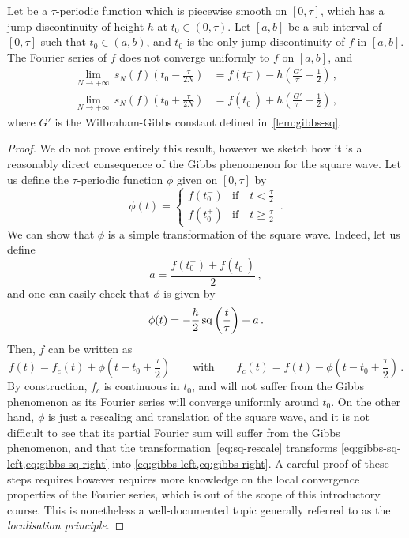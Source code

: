 \begin{theorem}
  Let be a $\tau$-periodic function which is piecewise smooth on $[0,\tau]$, which has a
  jump discontinuity of height $h$ at $t_0\in(0,\tau)$. Let $[a,b]$ be a sub-interval of
  $[0,\tau]$ such that $t_0\in(a,b)$, and $t_0$ is the only jump discontinuity of $f$ in
  $[a,b]$. The Fourier series of $f$ does not converge uniformly to $f$ on $[a,b]$, and
  \begin{align}
    \lim_{N\to+\infty}\,s_N(f)\left(t_0-\frac{\tau}{2N}\right)
    &=f(t_0^-)-h\left(\frac{G'}{\pi}-\frac12\right)\,,\label{eq:gibbs-left}\\
    \lim_{N\to+\infty}\,s_N(f)\left(t_0+\frac{\tau}{2N}\right)
    &=f(t_0^+)+h\left(\frac{G'}{\pi}-\frac12\right)\,,\label{eq:gibbs-right}
  \end{align}
  where $G'$ is the Wilbraham-Gibbs constant defined in~\cref{lem:gibbs-sq}.
\end{theorem}
\begin{proof}
  We do not prove entirely this result, however we sketch how it is a reasonably direct
  consequence of the Gibbs phenomenon for the square wave. Let us define the
  $\tau$-periodic function $\phi$ given on $[0,\tau]$ by
  \begin{equation}
    \phi(t)=
    \begin{cases}
      f(t_0^-)&\text{if}\quad t<\frac{\tau}{2}\\
      f(t_0^+)&\text{if}\quad t\geq \frac{\tau}{2}
    \end{cases}\,.
  \end{equation}
  We can show that $\phi$ is a simple transformation of the square wave. Indeed, let us
  define
  \begin{equation}
    a=\frac{f(t_0^-)+f(t_0^+)}{2}\,,
  \end{equation}
  and one can easily check that $\phi$ is given by
  \begin{equation}
    \phi(t)=-\frac{h}{2}\operatorname{sq}\left(\frac{t}{\tau}\right)+a\,.\label{eq:sq-rescale}
  \end{equation}
  Then, $f$ can be written as
  \begin{equation}
    f(t)=f_c(t)+\phi\left(t-t_0+\frac{\tau}{2}\right)\qquad\text{with}\qquad f_c(t)=f(t)
    -\phi\left(t-t_0+\frac{\tau}{2}\right)\,.
  \end{equation}
  By construction, $f_c$ is continuous in $t_0$, and will not suffer from the Gibbs
  phenomenon as its Fourier series will converge uniformly around $t_0$. On the other
  hand, $\phi$ is just a rescaling and translation of the square wave, and it is not
  difficult to see that its partial Fourier sum will suffer from the Gibbs phenomenon, and
  that the transformation~\cref{eq:sq-rescale} transforms
  \cref{eq:gibbs-sq-left,eq:gibbs-sq-right} into \cref{eq:gibbs-left,eq:gibbs-right}. A
  careful proof of these steps requires however requires more knowledge on the local
  convergence properties of the Fourier series, which is out of the scope of this
  introductory course. This is nonetheless a well-documented topic generally referred to
  as the \emph{localisation principle}.
\end{proof}
